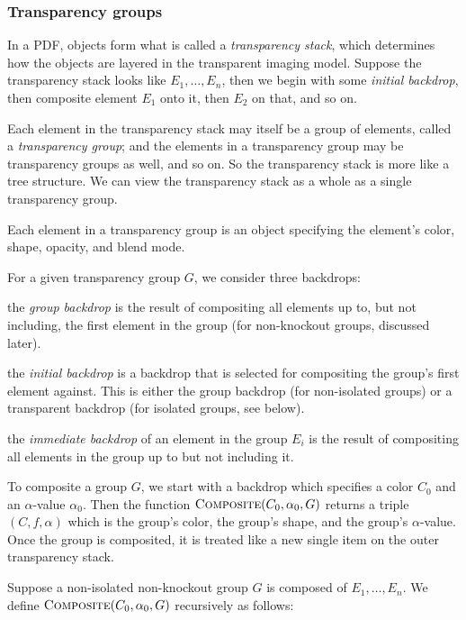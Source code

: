 \subsubsection{Transparency groups}

In a PDF, objects form what is called a {\it transparency stack}, which determines how the objects are
layered in the transparent imaging model.
Suppose the transparency stack looks like $E_1,\dots,E_n$, then we begin with some {\it initial backdrop},
then composite element $E_1$ onto it, then $E_2$ on that, and so on.

Each element in the transparency stack may itself be a group of elements, called a {\it transparency group};
and the elements in a transparency group may be transparency groups as well, and so on.
So the transparency stack is more like a tree structure.
We can view the transparency stack as a whole as a single transparency group.

Each element in a transparency group is an object specifying the element's color, shape, opacity, and
blend mode.

For a given transparency group $G$, we consider three backdrops:
\benum
    \item the {\it group backdrop} is the result of compositing all elements up to, but not including, the
    first element in the group (for non-knockout groups, discussed later).
    \item the {\it initial backdrop} is a backdrop that is selected for compositing the group's first element
    against.
    This is either the group backdrop (for non-isolated groups) or a transparent backdrop (for isolated groups,
    see below).
    \item the {\it immediate backdrop} of an element in the group $E_i$ is the result of compositing all
    elements in the group up to but not including it.
\eenum

To composite a group $G$, we start with a backdrop which specifies a color $C_0$ and an $\alpha$-value
$\alpha_0$.
Then the function $\hbox{\sc Composite}(C_0,\alpha_0,G)$ returns a triple $(C,f,\alpha)$ which is the group's color,
the group's shape, and the group's $\alpha$-value.
Once the group is composited, it is treated like a new single item on the outer transparency stack.

Suppose a non-isolated non-knockout group $G$ is composed of $E_1,\dots,E_n$.
We define $\hbox{\sc Composite}(C_0,\alpha_0,G)$ recursively as follows:

